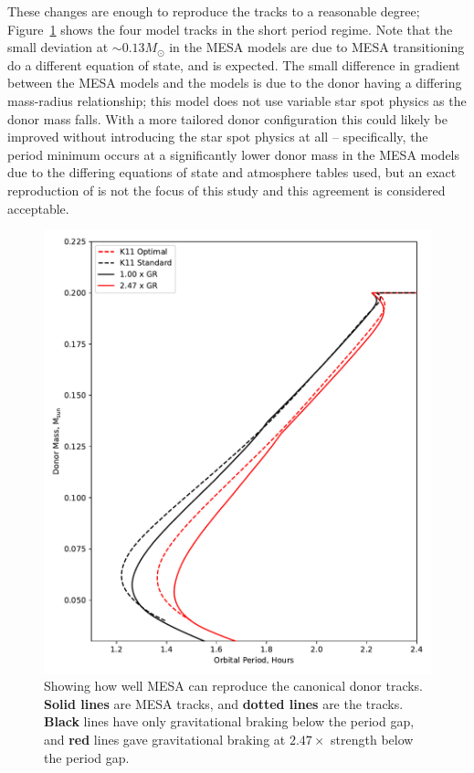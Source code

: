These changes are enough to reproduce the \citet{knigge11} tracks to a reasonable degree; Figure~\ref{fig:results:MESA can reproduce the K11 tracks} shows the four model tracks in the short period regime.
Note that the small deviation at $\sim 0.13 M_\odot$ in the MESA models are due to MESA transitioning do a different equation of state, and is expected.
The small difference in gradient between the MESA models and the \citet{knigge11} models is due to the donor having a differing mass-radius relationship; this model does not use variable star spot physics as the donor mass falls.
With a more tailored donor configuration this could likely be improved without introducing the star spot physics at all -- specifically, the period minimum occurs at a significantly lower donor mass in the MESA models due to the differing equations of state and atmosphere tables used, but an exact reproduction of \citet{knigge11} is not the focus of this study and this agreement is considered acceptable.

\begin{figure}
    \centering
    \includegraphics[width=.9\textwidth]{figures/modelling/reproducing_K11_tracks_fspot0.100.pdf}
    \caption{Showing how well MESA can reproduce the canonical \citet{knigge11} donor tracks. {\bf Solid lines} are MESA tracks, and {\bf dotted lines} are the \citet{knigge11} tracks. {\bf Black} lines have only gravitational braking below the period gap, and {\bf red} lines gave gravitational braking at $2.47\times$ strength below the period gap.}
    \label{fig:results:MESA can reproduce the K11 tracks}
\end{figure}


